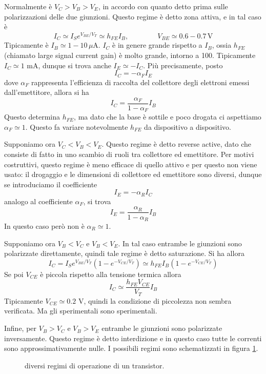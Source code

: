 \documentclass[a4paper, 11pt]{article}
\begin{document}
	Normalmente è $V_C>V_B>V_E$, in accordo con quanto detto prima sulle polarizzazioni delle due giunzioni. Questo regime è detto zona attiva, e in tal caso è
	\[I_C\simeq I_Se^{V_{BE}/V_T}\simeq h_{FE}I_B,\qquad\qquad V_{BE}\simeq 0.6-0.7\,\mathrm{V}\]
	Tipicamente è $I_B\simeq1-10\,\mu$A. $I_C$ è in genere grande rispetto a $I_B$, ossia $h_{FE}$ (chiamato large signal current gain) è molto grande, intorno a 100. Tipicamente $I_C\simeq 1$ mA, dunque si trova anche $I_E\simeq-I_C$. Più precisamente, posto
	\[I_C=-\alpha_FI_E\]
	dove $\alpha_F$ rappresenta l'efficienza di raccolta del collettore degli elettroni emessi dall'emettitore, allora si ha
	\[I_C=\frac{\alpha_F}{1-\alpha_F}I_B\]
	Questo determina $h_{FE}$, ma dato che la base è sottile e poco drogata ci aspettiamo $\alpha_F\simeq1$. Questo fa variare notevolmente $h_{FE}$ da dispositivo a dispositivo.
	
	Supponiamo ora $V_C<V_B<V_E$. Questo regime è detto reverse active, dato che consiste di fatto in uno scambio di ruoli tra collettore ed emettitore. Per motivi costruttivi, questo regime è meno efficace di quello attivo e per questo non viene usato: il drogaggio e le dimensioni di collettore ed emettitore sono diversi, dunque se introduciamo il coefficiente
	\[I_E=-\alpha_RI_C\]
	analogo al coefficiente $\alpha_F$, si trova
	\[I_E=\frac{\alpha_R}{1-\alpha_R}I_B\]
	In questo caso però non è $\alpha_R\simeq1$.
	
	Supponiamo ora $V_B<V_C$ e $V_B<V_E$. In tal caso entrambe le giunzioni sono polarizzate direttamente, quindi tale regime è detto saturazione. Si ha allora
	\[I_C=I_Se^{V_{BE}/V_T}\left(1-e^{-V_{CE}/V_T}\right)\simeq h_{FE}I_B\left(1-e^{-V_{CE}/V_T}\right)\]
	Se poi $V_{CE}$ è piccola rispetto alla tensione termica allora
	\[I_C\simeq\frac{h_{FE}V_{CE}}{V_T}I_B\]
	Tipicamente $V_{CE}\simeq0.2$ V, quindi la condizione di piccolezza non sembra verificata. Ma gli sperimentali sono sperimentali.
	
	Infine, per $V_B>V_C$ e $V_B>V_E$ entrambe le giunzioni sono polarizzate inversamente. Questo regime è detto interdizione e in questo caso tutte le correnti sono approssimativamente nulle. I possibili regimi sono schematizzati in figura \ref{fig:regbjt}.
	\begin{figure}[h!]
		\centering
		\caption{diversi regimi di operazione di un transistor.}
		\label{fig:regbjt}
	\end{figure}
	
\end{document}
